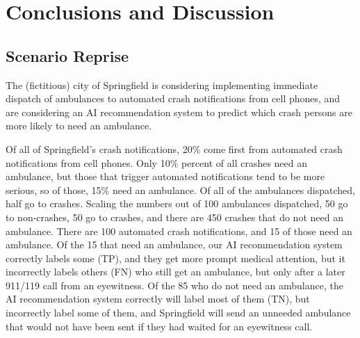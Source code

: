 \section{Conclusions and Discussion}
\label{conclusions}

\subsection{Scenario Reprise}
\label{scenario_reprise}

The (fictitious) city of Springfield is considering implementing immediate dispatch of ambulances to automated crash notifications from cell phones, and are considering an AI recommendation system to predict which crash persons are more likely to need an ambulance. 

Of all of Springfield's crash notifications, 20\% come first from automated crash notifications from cell phones.  Only 10\% percent of all crashes need an ambulance, but those that trigger automated notifications tend to be more serious, so of those, 15\% need an ambulance.  Of all of the ambulances dispatched, half go to crashes.  Scaling the numbers out of 100 ambulances dispatched, 50 go to non-crashes, 50 go to crashes, and there are 450 crashes that do not need an ambulance.  There are 100 automated crash notifications, and 15 of those need an ambulance.  Of the 15 that need an ambulance, our AI recommendation system correctly labels some (TP), and they get more prompt medical attention, but it incorrectly labels others (FN) who still get an ambulance, but only after a later 911/119 call from an eyewitness.  Of the 85 who do not need an ambulance, the AI recommendation system correctly will label most of them (TN), but incorrectly label some of them, and Springfield will send an unneeded ambulance that would not have been sent if they had waited for an eyewitness call.  


